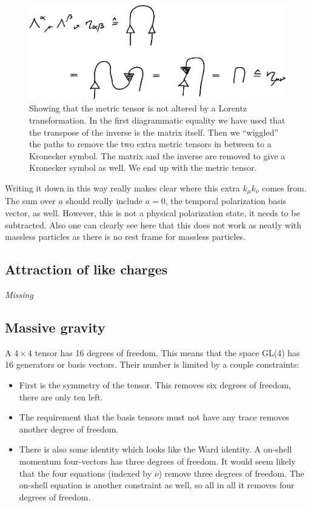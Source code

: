 \documentclass[11pt, english, fleqn, DIV=15, headinclude]{scrartcl}
\begin{document}
\begin{figure}
    \centering
    \includegraphics[width=\linewidth]{Diagrams-page-02-crop.pdf}
    \caption{%
        Showing that the metric tensor is not altered by a Lorentz
        transformation. In the first diagrammatic equality we have used that
        the transpose of the inverse is the matrix itself. Then we “wiggled”
        the paths to remove the two extra metric tensors in between to a
        Kronecker symbol. The matrix and the inverse are removed to give a
        Kronecker symbol as well. We end up with the metric tensor.
    }
    \label{fig:02}
\end{figure}

Writing it down in this way really makes clear where this extra $k_\mu k_\nu$
comes from. The sum over $a$ should really include $a = 0$, the temporal
polarization basis vector, as well. However, this is not a physical
polarization state, it needs to be subtracted. Also one can clearly see here
that this does not work as neatly with massless particles as there is no rest
frame for massless particles.

\subsection{Attraction of like charges}

\emph{Missing}

\subsection{Massive gravity}

A $4 \times 4$ tensor has 16 degrees of freedom. This means that the space
GL(4) has 16 generators or basis vectors. Their number is limited by a couple
constraints:

\begin{itemize}
    \item 
        First is the symmetry of the tensor. This removes six degrees of
        freedom, there are only ten left.

    \item
        The requirement that the basis tensors must not have any trace removes
        another degree of freedom.

    \item
        There is also some identity which looks like the Ward identity. A
        on-shell momentum four-vectors has three degrees of freedom. It would
        seem likely that the four equations (indexed by $\nu$) remove three
        degrees of freedom. The on-shell equation is another constraint as
        well, so all in all it removes four degrees of freedom.
\end{itemize}
\end{document}
